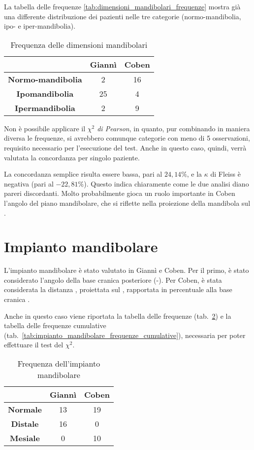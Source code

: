 La tabella delle frequenze \vref{tab:dimensioni_mandibolari_frequenze} mostra già una differente distribuzione dei pazienti nelle tre categorie (normo-mandibolia, ipo- e iper-mandibolia).

\begin{table}[h]
\centering
\caption{Frequenza delle dimensioni mandibolari}
\label{tab:dimensioni_mandibolari_frequenze}
\begin{tabular}{>{\bfseries}ccc}
\toprule
 & \textbf{Giannì} & \textbf{Coben} \\
\midrule
Normo-mandibolia & 2 & 16 \\
Ipomandibolia & 25 & 4 \\
Ipermandibolia & 2 & 9 \\
\bottomrule
\end{tabular}
\end{table}

Non è possibile applicare il \emph{$\chi^2$ di Pearson}, in quanto, pur combinando in maniera diversa le frequenze, si avrebbero comunque categorie con meno di 5 osservazioni, requisito necessario per l'esecuzione del test. Anche in questo caso, quindi, verrà valutata la concordanza per singolo paziente.

La concordanza semplice risulta essere bassa, pari al $24,14\%$, e la $\kappa$ di Fleiss è negativa (pari al $-22,81\%$). Questo indica chiaramente come le due analisi diano pareri discordanti. Molto probabilmente gioca un ruolo importante in Coben l'angolo del piano mandibolare, che si riflette nella proiezione della mandibola sul .

\section{Impianto mandibolare}
L'impianto mandibolare è stato valutato in Giannì e Coben. Per il primo, è stato considerato l'angolo della base cranica posteriore (-). Per Coben, è stata considerata la distanza , proiettata sul , rapportata in percentuale alla base cranica .

Anche in questo caso viene riportata la tabella delle frequenze (tab.~\ref{tab:impianto_mandibolare_frequenze}) e la tabella delle frequenze cumulative (tab.~\ref{tab:impianto_mandibolare_frequenze_cumulative}), necessaria per poter effettuare il test del $\chi^2$.

\begin{table}[ht]
\centering
\caption{Frequenza dell'impianto mandibolare}
\label{tab:impianto_mandibolare_frequenze}
\begin{tabular}{>{\bfseries}ccc}
\toprule
 & \textbf{Giannì} & \textbf{Coben} \\
\midrule
Normale & 13 & 19 \\
Distale & 16 & 0 \\
Mesiale & 0 & 10 \\
\bottomrule
\end{tabular}
\end{table}

